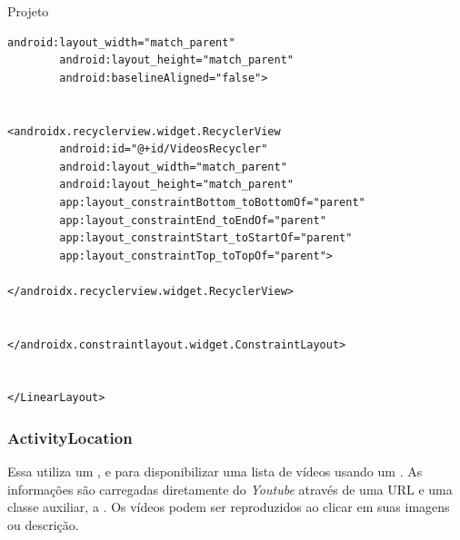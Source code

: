 \documentclass[
	12pt,				%
	openright,			%
	twoside,			%
	a4paper,			%
	english,			%
	french,				%
	spanish,			%
	brazil				%
	]{abntex2}
\begin{document}
\begin{chapter}{Projeto}
\begin{lstlisting}[numbers=none,basicstyle=\small,
caption={FragmentVideos.xml},
title={FragmentVideos.xml},
label={FragmentVideos.xml}]
		android:layout_width="match_parent"
		android:layout_height="match_parent"
		android:baselineAligned="false">


<androidx.recyclerview.widget.RecyclerView
		android:id="@+id/VideosRecycler"
		android:layout_width="match_parent"
		android:layout_height="match_parent"
		app:layout_constraintBottom_toBottomOf="parent"
		app:layout_constraintEnd_toEndOf="parent"
		app:layout_constraintStart_toStartOf="parent"
		app:layout_constraintTop_toTopOf="parent">

</androidx.recyclerview.widget.RecyclerView>


</androidx.constraintlayout.widget.ConstraintLayout>


</LinearLayout>
\end{lstlisting}

\newpage
\subsubsection{ActivityLocation}
Essa  utiliza um ,  e  para disponibilizar uma lista de vídeos usando um . As informações são carregadas diretamente do \textit{Youtube} através de uma URL e uma classe auxiliar, a . Os vídeos podem ser reproduzidos ao clicar em suas imagens ou descrição.


\end{chapter}
\end{document}

